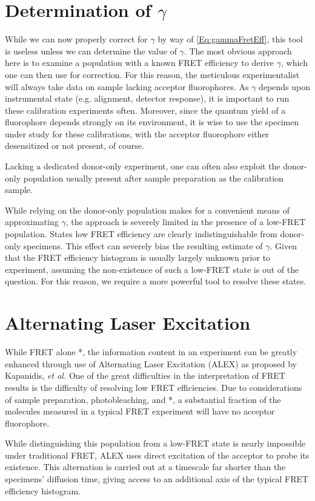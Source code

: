 \documentclass{article}
\begin{document}
\section{Determination of $\gamma$}
While we can now properly correct for $\gamma$ by way of
\eqref{Eq:gammaFretEff}, this tool is useless unless we can determine
the value of $\gamma$. The most obvious approach here is to examine a
population with a known FRET efficiency to derive $\gamma$, which one
can then use for correction. For this reason, the meticulous
experimentalist will always take data on sample lacking acceptor
fluorophores. As $\gamma$ depends upon instrumental state
(e.g. alignment, detector response), it is important to run these
calibration experiments often. Moreover, since the quantum yield of a
fluorophore depends strongly on its environment, it is wise to use the
specimen under study for these calibrations, with the acceptor
fluorophore either desensitized or not present, of course.

Lacking a dedicated donor-only experiment, one can often also
exploit the donor-only population usually present after sample
preparation as the calibration sample.

While relying on the donor-only population makes for a convenient
means of approximating $\gamma$, the approach is severely limited in
the presence of a low-FRET population. States low FRET efficiency are
clearly indistinguishable from donor-only specimens. This effect can
severely bias the resulting estimate of $\gamma$. Given that the FRET
efficiency histogram is usually largely unknown prior to experiment,
assuming the non-existence of such a low-FRET state is out of the
question. For this reason, we require a more powerful tool to resolve
these states.

\section{Alternating Laser Excitation}
While FRET alone *, the information content in an experiment can be
greatly enhanced through use of Alternating Laser Excitation (ALEX) as
proposed by Kapanidis, {\it et al.} One of the great difficulties in
the interpretation of FRET results is the difficulty of resolving low
FRET efficiencies. Due to considerations of sample preparation,
photobleaching, and *, a substantial fraction of the molecules
measured in a typical FRET experiment will have no acceptor
fluorophore.

While distinguishing this population from a low-FRET state is nearly
impossible under traditional FRET, ALEX uses direct excitation of the
acceptor to probe its existence. This alternation is carried out at a
timescale far shorter than the specimens' diffusion time, giving
access to an additional axis of the typical FRET efficiency histogram.
\end{document}
